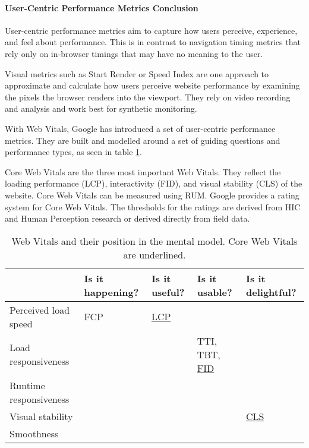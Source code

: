 
\paragraph{User-Centric Performance Metrics Conclusion} %


User-centric performance metrics aim to capture how users perceive, experience, and feel about performance.
This is in contrast to navigation timing metrics that rely only on in-browser timings that may have no meaning to the user.


Visual metrics such as Start Render or Speed Index are one approach to approximate and calculate how users perceive website performance by examining the pixels the browser renders into the viewport.
They rely on video recording and analysis and work best for synthetic monitoring.


With Web Vitals, Google has introduced a set of user-centric performance metrics.
They are built and modelled around a set of guiding questions and performance types, as seen in table \ref{table:vitals_summary}.

Core Web Vitals are the three most important Web Vitals.
They reflect the loading performance (LCP), interactivity (FID), and visual stability (CLS) of the website.
Core Web Vitals can be measured using RUM.
Google provides a rating system for Core Web Vitals.
The thresholds for the ratings are derived from HIC and Human Perception research or derived directly from field data.


\begin{table}[h]
	\small
	\centering
	\begin{tabular}{ | l | l | l | l | l |}
	\hline
	\cellcolor{lightgrey} & Is it happening? & Is it useful? & Is it usable? & Is it delightful? \\
	\hline
	Perceived load speed & FCP & \underline{LCP} & & \\
	\hline
	Load responsiveness & & & TTI, TBT, \underline{FID} & \\
	\hline
	Runtime responsiveness & & & & \\
	\hline
	Visual stability & & & & \underline{CLS} \\
	\hline
	Smoothness & & & & \\
	\hline
	\end{tabular}
	\medskip
	\caption{Web Vitals and their position in the mental model. Core Web Vitals are underlined.}
	\label{table:vitals_summary}
\end{table}

